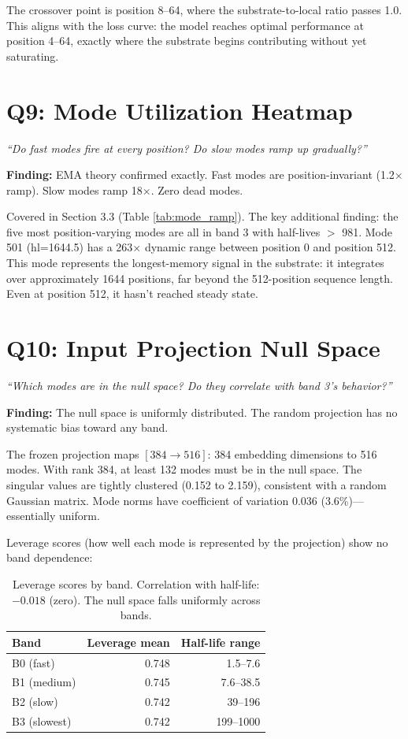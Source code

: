 \documentclass[11pt,a4paper]{report}
\newcommand{\cq}[1]{\textcolor{q}{\textit{``#1''}}}
\newcommand{\finding}[1]{\textcolor{finding}{\textbf{Finding:}} #1}
\begin{document}
The crossover point is position 8--64, where the substrate-to-local ratio passes 1.0. This aligns with the loss curve: the model reaches optimal performance at position 4--64, exactly where the substrate begins contributing without yet saturating.


\section{Q9: Mode Utilization Heatmap}

\cq{Do fast modes fire at every position? Do slow modes ramp up gradually?}

\finding{EMA theory confirmed exactly. Fast modes are position-invariant (1.2$\times$ ramp). Slow modes ramp 18$\times$. Zero dead modes.}

Covered in Section 3.3 (Table \ref{tab:mode_ramp}). The key additional finding: the five most position-varying modes are all in band 3 with half-lives $>$ 981. Mode 501 (hl=1644.5) has a 263$\times$ dynamic range between position 0 and position 512. This mode represents the longest-memory signal in the substrate: it integrates over approximately 1644 positions, far beyond the 512-position sequence length. Even at position 512, it hasn't reached steady state.


\section{Q10: Input Projection Null Space}

\cq{Which modes are in the null space? Do they correlate with band 3's behavior?}

\finding{The null space is uniformly distributed. The random projection has no systematic bias toward any band.}

The frozen projection maps $[384 \to 516]$: 384 embedding dimensions to 516 modes. With rank 384, at least 132 modes must be in the null space. The singular values are tightly clustered (0.152 to 2.159), consistent with a random Gaussian matrix. Mode norms have coefficient of variation 0.036 (3.6\%)---essentially uniform.

Leverage scores (how well each mode is represented by the projection) show no band dependence:

\begin{table}[h]
\centering
\begin{tabular}{lrr}
\toprule
\textbf{Band} & \textbf{Leverage mean} & \textbf{Half-life range} \\
\midrule
B0 (fast) & 0.748 & 1.5--7.6 \\
B1 (medium) & 0.745 & 7.6--38.5 \\
B2 (slow) & 0.742 & 39--196 \\
B3 (slowest) & 0.742 & 199--1000 \\
\bottomrule
\end{tabular}
\caption{Leverage scores by band. Correlation with half-life: $-0.018$ (zero). The null space falls uniformly across bands.}
\label{tab:leverage}
\end{table}
\end{document}
